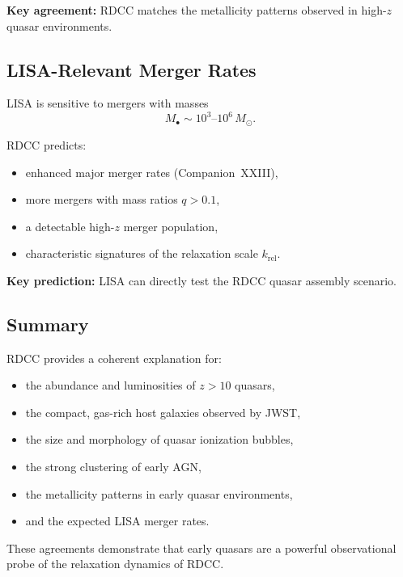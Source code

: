 \documentclass[11pt,a4paper]{article}
\begin{document}
\textbf{Key agreement:}  
RDCC matches the metallicity patterns observed in high-$z$ quasar environments.

\subsection{LISA-Relevant Merger Rates}

LISA is sensitive to mergers with masses
\begin{equation}
M_{\bullet}
\sim
10^{3}\text{--}10^{6}\,M_{\odot}.
\end{equation}

RDCC predicts:
\begin{itemize}
\item enhanced major merger rates (Companion~XXIII),
\item more mergers with mass ratios $q > 0.1$,
\item a detectable high-$z$ merger population,
\item characteristic signatures of the relaxation scale $k_{\mathrm{rel}}$.
\end{itemize}

\textbf{Key prediction:}  
LISA can directly test the RDCC quasar assembly scenario.

\subsection{Summary}

RDCC provides a coherent explanation for:
\begin{itemize}
\item the abundance and luminosities of $z > 10$ quasars,
\item the compact, gas-rich host galaxies observed by JWST,
\item the size and morphology of quasar ionization bubbles,
\item the strong clustering of early AGN,
\item the metallicity patterns in early quasar environments,
\item and the expected LISA merger rates.
\end{itemize}

These agreements demonstrate that early quasars are a powerful observational probe of the
relaxation dynamics of RDCC.

\end{document}
